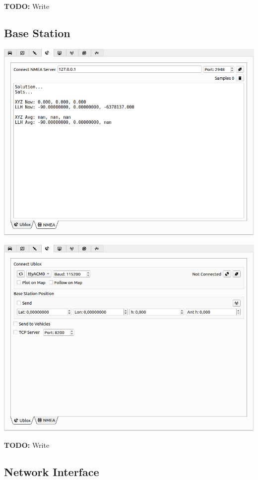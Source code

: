\documentclass[12pt]{article} %
\newcommand{\todo}[1]{{\color{red} \textbf{TODO:} #1}}
\begin{document}
\todo{Write}

\subsection{Base Station}

\noindent \includegraphics[width=\textwidth]{./screens/base_station_NMEA.png}

\noindent \includegraphics[width=\textwidth]{./screens/base_station_UBLOX.png}

\todo{Write}

\subsection{Network Interface}
\end{document}
